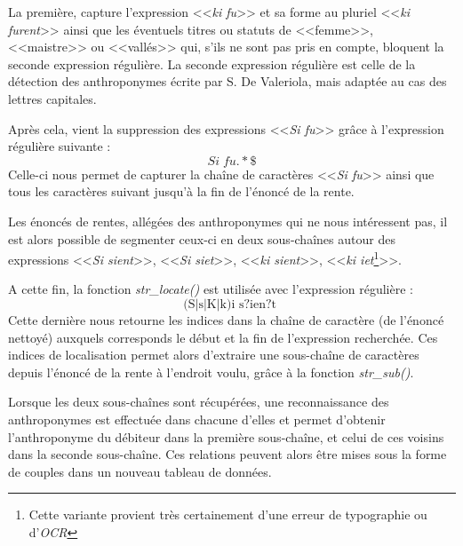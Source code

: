 La première, capture l'expression <<\textit{ki fu}>> et sa forme au pluriel <<\textit{ki furent}>> ainsi que les éventuels titres ou statuts de <<femme>>, <<maistre>> ou <<vallés>> qui, s'ils ne sont pas pris en compte, bloquent la seconde expression régulière. La seconde expression régulière est celle de la détection des anthroponymes écrite par S. De Valeriola, mais adaptée au cas des lettres capitales.

Après cela, vient la suppression des expressions <<\textit{Si fu}>> grâce à l'expression régulière suivante : 
\[ \boxed{ Si \;fu.*\$} \]
Celle-ci nous permet de capturer la chaîne de caractères <<\textit{Si fu}>> ainsi que tous les caractères suivant jusqu'à la fin de l'énoncé de la rente.

Les énoncés de rentes, allégées des anthroponymes qui ne nous intéressent pas, il est alors possible de segmenter ceux-ci en deux sous-chaînes autour des expressions <<\textit{Si sient}>>, <<\textit{Si siet}>>, <<\textit{ki sient}>>, <<\textit{ki iet}\footnote{Cette variante provient très certainement d'une erreur de typographie ou d'\textit{OCR}}>>.

A cette fin, la fonction \textit{str\_locate()} est utilisée avec l'expression régulière :
\[ 
    \boxed{
        \text{
            (S|s|K|k)i s?ien?t
        }
    }
\]
 Cette dernière nous retourne les indices dans la chaîne de caractère (de l'énoncé nettoyé) auxquels corresponds le début et la fin de l'expression recherchée. Ces indices de localisation permet alors d'extraire une sous-chaîne de caractères depuis l'énoncé de la rente à l'endroit voulu, grâce à la fonction \textit{str\_sub()}.
 
 Lorsque les deux sous-chaînes sont récupérées, une reconnaissance des anthroponymes est effectuée dans chacune d'elles  et permet d'obtenir l'anthroponyme du débiteur dans la première sous-chaîne, et celui de ces voisins dans la seconde sous-chaîne. Ces relations peuvent alors être mises sous la forme de couples dans un nouveau tableau de données.
 
